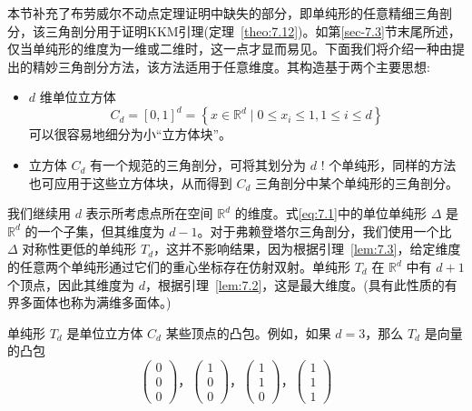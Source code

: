 本节补充了布劳威尔不动点定理证明中缺失的部分，即单纯形的任意精细三角剖分，该三角剖分用于证明KKM引理(定理~\ref{theo:7.12})。如第\ref{sec-7.3}节末尾所述，仅当单纯形的维度为一维或二维时，这一点才显而易见。下面我们将介绍一种由\citet{freudenthal1942}提出的精妙三角剖分方法，该方法适用于任意维度。其构造基于两个主要思想:

\begin{itemize}
\item \(d\) 维单位立方体
\[
{C}_{d} = {\left\lbrack  0,1\right\rbrack  }^{d} = \left\{  {x \in  {\mathbb{R}}^{d} \mid  0 \leq  {x}_{i} \leq  1,1 \leq  i \leq  d}\right\}
\]
可以很容易地细分为小“立方体块”。
\item 立方体 \({C}_{d}\) 有一个规范的三角剖分，可将其划分为 \(d\) ! 个单纯形，同样的方法也可应用于这些立方体块，从而得到 \({C}_{d}\) 三角剖分中某个单纯形的三角剖分。
\end{itemize}

我们继续用 \(d\) 表示所考虑点所在空间 \({\mathbb{R}}^{d}\) 的维度。式\eqref{eq:7.1}中的单位单纯形 \(\Delta\) 是 \({\mathbb{R}}^{d}\) 的一个子集，但其维度为 \(d - 1\)。对于弗赖登塔尔三角剖分，我们使用一个比 \(\Delta\) 对称性更低的单纯形 \({T}_{d}\)，这并不影响结果，因为根据引理~\ref{lem:7.3}，给定维度的任意两个单纯形通过它们的重心坐标存在仿射双射。单纯形 \({T}_{d}\) 在 \({\mathbb{R}}^{d}\) 中有 \(d + 1\) 个顶点，因此其维度为 \(d\)，根据引理~\ref{lem:7.2}，这是最大维度。(具有此性质的有界多面体也称为满维多面体。)

单纯形 \({T}_{d}\) 是单位立方体 \({C}_{d}\) 某些顶点的凸包。例如，如果 \(d = 3\)，那么 \({T}_{d}\) 是向量的凸包
\begin{equation}
\left( \begin{array}{l} 0 \\  0 \\  0 \end{array}\right)，\left( \begin{array}{l} 1 \\  0 \\  0 \end{array}\right)，\left( \begin{array}{l} 1 \\  1 \\  0 \end{array}\right)，\left( \begin{array}{l} 1 \\  1 \\  1 \end{array}\right)\label{eq:7.24}
\end{equation}

